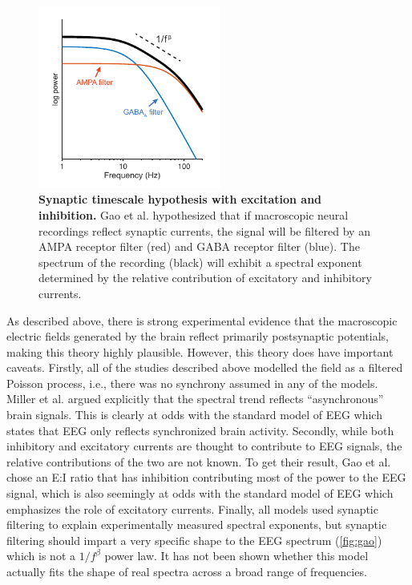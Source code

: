 \begin{figure}
\vspace{-20pt}
\centering
\includegraphics[width=60mm]{Figures/chapter1/EI.pdf}
\vspace{-14pt}
\caption{\textbf{Synaptic timescale hypothesis with excitation and inhibition.} Gao et al. \cite{Gao2017} hypothesized that if macroscopic neural recordings reflect synaptic currents, the signal will be filtered by an AMPA receptor filter (red) and GABA receptor filter (blue). The spectrum of the recording (black) will exhibit a spectral exponent determined by the relative contribution of excitatory and inhibitory currents.}  \label{fig:gao}
\end{figure}

As described above, there is strong experimental evidence that the macroscopic electric fields generated by the brain reflect primarily postsynaptic potentials, making this theory highly plausible. However, this theory does have important caveats. Firstly, all of the studies described above modelled the field as a filtered Poisson process, i.e., there was no synchrony assumed in any of the models. Miller et al.\cite{Miller2009} argued explicitly that the spectral trend reflects ``asynchronous'' brain signals. This is clearly at odds with the standard model of EEG which states that EEG only reflects synchronized brain activity. Secondly, while both inhibitory and excitatory currents are thought to contribute to EEG signals, the relative contributions of the two are not known. To get their result, Gao et al. \cite{Gao2017} chose an E:I ratio that has inhibition contributing  most of the power to the EEG signal, which is also seemingly at odds with the standard model of EEG which emphasizes the role of excitatory currents. Finally, all models used synaptic filtering to explain experimentally measured spectral exponents, but synaptic filtering should impart a very specific shape to the EEG spectrum (\autoref{fig:gao}) which is not a $1/f^\beta$ power law. It has not been shown whether this model actually fits the shape of real spectra across a broad range of frequencies.

